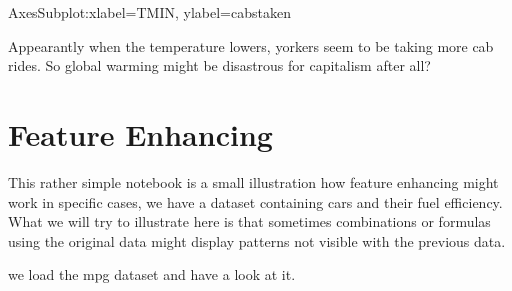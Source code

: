 \documentclass[letterpaper,10pt,english]{jupyterBook}
\begin{document}
\begin{sphinxVerbatim}[commandchars=\\\{\}]
  
\end{sphinxVerbatim}

\begin{sphinxVerbatim}[commandchars=\\\{\}]
\PYGZlt{}AxesSubplot:xlabel=\PYGZsq{}TMIN\PYGZsq{}, ylabel=\PYGZsq{}cabs\PYGZus{}taken\PYGZsq{}\PYGZgt{}
\end{sphinxVerbatim}

\noindent{}

\sphinxAtStartPar
Appearantly when the temperature lowers, yorkers seem to be taking more cab rides. So global warming might be disastrous for capitalism after all?


\chapter{Feature Enhancing}
\label{\detokenize{c5_data_exploration/feature_engineering:feature-enhancing}}\label{\detokenize{c5_data_exploration/feature_engineering::doc}}
\sphinxAtStartPar
This rather simple notebook is a small illustration how feature enhancing might work in specific cases, we have a dataset containing cars and their fuel efficiency. What we will try to illustrate here is that sometimes combinations or formulas using the original data might display patterns not visible with the previous data.

\begin{sphinxVerbatim}[commandchars=\\\{\}]
   
   
   
\end{sphinxVerbatim}

\sphinxAtStartPar
we load the mpg dataset and have a look at it.

\begin{sphinxVerbatim}[commandchars=\\\{\}]
  
\end{sphinxVerbatim}
\end{document}
